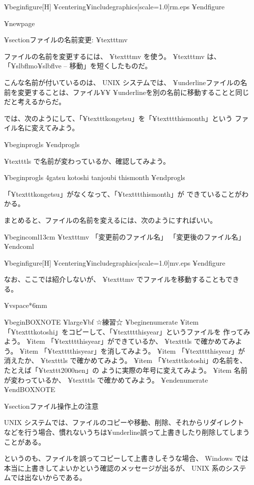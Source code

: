 ¥begin{figure}[H]
¥centering{¥includegraphics[scale=1.0]{rm.eps}}
¥end{figure}

¥newpage

¥section{ファイルの名前変更: ¥texttt{mv}}

ファイルの名前を変更するには、 ¥texttt{mv} を使う。
¥texttt{mv} は、「¥slbfl{m}o¥slbfl{v}e -- 移動」を短くしたものだ。

こんな名前が付いているのは、 UNIX システムでは、
¥underline{ファイルの名前を変更することは、ファイル}¥¥
¥underline{を別の名前に移動することと同じ}
だと考えるからだ。

では、次のようにして、「¥texttt{kongetsu}」を「¥texttt{thismonth}」という
ファイル名に変えてみよう。

¥begin{progls}
%
¥end{progls}

¥texttt{ls} で名前が変わっているか、確認してみよう。

¥begin{progls}
4gatsu          kotoshi         tanjoubi        thismonth
%
¥end{progls}

「¥texttt{kongetsu}」がなくなって、「¥texttt{thismonth}」が
できていることがわかる。

まとめると、ファイルの名前を変えるには、次のようにすればいい。

¥begin{coml}{13cm}
¥texttt{mv} 「変更前のファイル名」 「変更後のファイル名」
¥end{coml}

¥begin{figure}[H]
¥centering{¥includegraphics[scale=1.0]{mv.eps}}
¥end{figure}

なお、ここでは紹介しないが、 ¥texttt{mv} でファイルを移動することもできる。

¥vspace*{6mm}

¥begin{BOXNOTE}
{¥large¥bf ☆練習☆}
¥begin{enumerate}
¥item 「¥texttt{kotoshi}」をコピーして、「¥texttt{thisyear}」というファイルを
作ってみよう。
¥item 「¥texttt{thisyear}」ができているか、 ¥texttt{ls} で確かめてみよう。
¥item 「¥texttt{thisyear}」を消してみよう。
¥item 「¥texttt{thisyear}」が消えたか、 ¥texttt{ls} で確かめてみよう。
¥item 「¥texttt{kotoshi}」の名前を、たとえば「¥texttt{2000nen}」の
ように実際の年号に変えてみよう。
¥item 名前が変わっているか、 ¥texttt{ls} で確かめてみよう。
¥end{enumerate}
¥end{BOXNOTE}

¥section{ファイル操作上の注意}

UNIX システムでは、ファイルのコピーや移動、削除、それからリダイレクト
などを行う場合、慣れないうちは¥underline{誤って上書きしたり削除してしまう}
ことがある。

というのも、ファイルを誤ってコピーして上書きしそうな場合、
 Windows では本当に上書きしてよいかという確認のメッセージが出るが、
 UNIX 系のシステムでは出ないからである。

